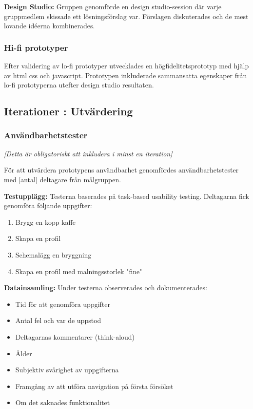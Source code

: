 \textbf{Design Studio:} Gruppen genomförde en design studio-session där varje gruppmedlem skissade ett lösningsförslag var. Förslagen diskuterades och de mest lovande idéerna kombinerades. 



\subsubsection{Hi-fi prototyper}

Efter validering av lo-fi prototyper utvecklades en högfidelitetsprototyp med hjälp av html css och javascript. Prototypen inkluderade sammansatta egenskaper från lo-fi prototyperna utefter design studio resultaten.


\subsection{Iterationer : Utvärdering} %

\subsubsection{Användbarhetstester}

\textit{[Detta är obligatoriskt att inkludera i minst en iteration]}

För att utvärdera prototypens användbarhet genomfördes användbarhetstester med [antal] deltagare från målgruppen.

\textbf{Testupplägg:} Testerna baserades på task-based usability testing. Deltagarna fick genomföra följande uppgifter:
\begin{enumerate}
    \item Brygg en kopp kaffe
    \item Skapa en profil 
    \item Schemalägg en bryggning
    \item Skapa en profil med malningsstorlek "fine"
\end{enumerate}

\textbf{Datainsamling:} Under testerna observerades och dokumenterades:
\begin{itemize}
    \item Tid för att genomföra uppgifter
    \item Antal fel och var de uppstod
    \item Deltagarnas kommentarer (think-aloud)
    \item Ålder 
    \item Subjektiv svårighet av uppgifterna 
    \item Framgång av att utföra navigation på första försöket 
    \item Om det saknades funktionalitet
\end{itemize}

